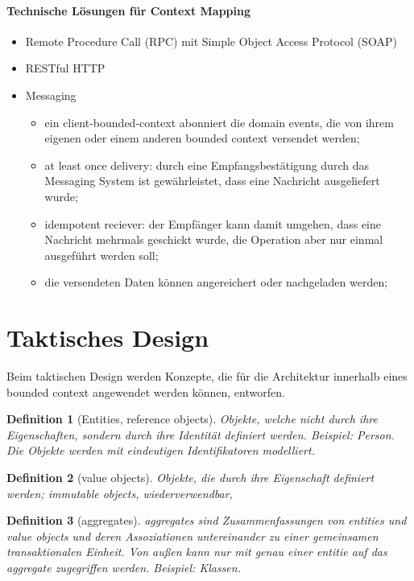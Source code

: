 \documentclass[11pt,a4paper]{scrartcl}
\newtheorem{Def}{Definition}[section]
\begin{document}
\paragraph{Technische Lösungen für Context Mapping}
\begin{itemize}
	\item Remote Procedure Call (RPC) mit Simple Object Access Protocol (SOAP)
	\item RESTful HTTP
	\item Messaging
	\begin{itemize}
		\item ein client-bounded-context abonniert die domain events, die von ihrem eigenen oder einem anderen bounded context versendet werden;
		\item at least once delivery: durch eine Empfangsbestätigung durch das Messaging System ist gewährleistet, dass eine Nachricht ausgeliefert wurde;
		\item idempotent reciever: der Empfänger kann  damit umgehen, dass eine Nachricht mehrmals geschickt wurde, die Operation aber nur einmal ausgeführt werden soll;
		\item die versendeten Daten können angereichert oder nachgeladen werden;
	\end{itemize}
\end{itemize}

\section{Taktisches Design}

Beim taktischen Design werden Konzepte, die für die Architektur innerhalb eines bounded context angewendet werden können, entworfen.

\begin{Def}[Entities, reference objects]
	Objekte, welche nicht durch ihre Eigenschaften, sondern durch ihre Identität definiert werden. Beispiel: Person. Die Objekte werden mit eindeutigen Identifikatoren modelliert.
\end{Def}

\begin{Def}[value objects]
	Objekte, die durch ihre Eigenschaft definiert werden; immutable objects, wiederverwendbar,
\end{Def}

\begin{Def}[aggregates]
	aggregates sind Zusammenfassungen von entities und value objects und deren Assoziationen untereinander zu einer gemeinsamen transaktionalen Einheit. Von außen kann nur mit genau einer entitie auf das aggregate zugegriffen werden. Beispiel: Klassen.
\end{Def}
\end{document}

